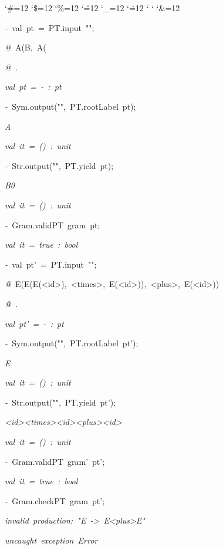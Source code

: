 \begin{list}{}
{\setlength{\leftmargin}{\leftmargini}
\setlength{\rightmargin}{0cm}
\setlength{\itemindent}{0cm}
\setlength{\listparindent}{0cm}
\setlength{\itemsep}{0cm}
\setlength{\parsep}{0cm}
\setlength{\labelsep}{0cm}
\setlength{\labelwidth}{0cm}
\catcode`\#=12
\catcode`\$=12
\catcode`\%=12
\catcode`\^=12
\catcode`\_=12
\catcode`\.=12
\catcode`
\catcode`
\catcode`\&=12
\ttfamily}
\small
\item[]\textsl{-\ }val\ pt\ =\ PT.input\ "";
\item[]\textsl{@\ }A(B,\ A(%
\item[]\textsl{@\ }.
\item[]\textsl{val\ pt\ =\ -\ :\ pt}
\item[]\textsl{-\ }Sym.output("",\ PT.rootLabel\ pt);
\item[]\textsl{A}
\item[]\textsl{val\ it\ =\ ()\ :\ unit}
\item[]\textsl{-\ }Str.output("",\ PT.yield\ pt);
\item[]\textsl{B0}
\item[]\textsl{val\ it\ =\ ()\ :\ unit}
\item[]\textsl{-\ }Gram.validPT\ gram\ pt;
\item[]\textsl{val\ it\ =\ true\ :\ bool}
\item[]\textsl{-\ }val\ pt'\ =\ PT.input\ "";
\item[]\textsl{@\ }E(E(E(<id>),\ <times>,\ E(<id>)),\ <plus>,\ E(<id>))
\item[]\textsl{@\ }.
\item[]\textsl{val\ pt'\ =\ -\ :\ pt}
\item[]\textsl{-\ }Sym.output("",\ PT.rootLabel\ pt');
\item[]\textsl{E}
\item[]\textsl{val\ it\ =\ ()\ :\ unit}
\item[]\textsl{-\ }Str.output("",\ PT.yield\ pt');
\item[]\textsl{<id><times><id><plus><id>}
\item[]\textsl{val\ it\ =\ ()\ :\ unit}
\item[]\textsl{-\ }Gram.validPT\ gram'\ pt';
\item[]\textsl{val\ it\ =\ true\ :\ bool}
\item[]\textsl{-\ }Gram.checkPT\ gram\ pt';
\item[]\textsl{invalid\ production:\ "E\ ->\ E<plus>E"}
\item[]
\item[]\textsl{uncaught\ exception\ Error}

\end{list}
